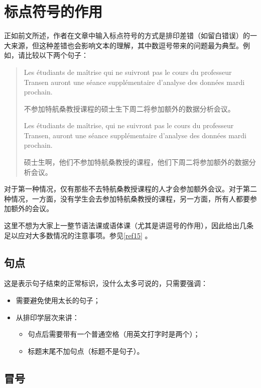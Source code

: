 \section{标点符号的作用}

正如前文所述，作者在文章中输入标点符号的方式是排印差错（如留白错误）的一大来源，但这种差错也会影响文本的理解，其中数逗号带来的问题最为典型。例如，请比较以下两个句子：

\begin{quote}
    Les étudiants de maîtrise qui ne suivront pas le cours du professeur Transen auront une séance supplémentaire d’analyse des données mardi prochain.
    \begin{bil}
        不参加特航桑教授课程的硕士生下周二将参加额外的数据分析会议。
    \end{bil}

    Les étudiants de maîtrise, qui ne suivront pas le cours du professeur Transen, auront une séance supplémentaire d’analyse des données mardi prochain.
    \begin{bil}
        硕士生啊，他们不参加特航桑教授的课程，他们下周二将参加额外的数据分析会议。
    \end{bil}
\end{quote}

对于第一种情况，仅有那些不去特航桑教授课程的人才会参加额外会议。对于第二种情况，一方面，没有学生会去参加特航桑教授的课程，另一方面，所有人都要参加额外的会议。

这里不想为大家上一整节语法课或语体课（尤其是讲逗号的作用），因此给出几条足以应对大多数情况的注意事项。参见\ref{ref15}%
。

\subsection{句点}

这是表示句子结束的正常标识，没什么太多可说的，只需要强调：

\begin{itemize}
    \item 需要避免使用太长的句子；
    \item 从排印学层次来讲：
    \begin{itemize}
        \item 句点后需要带有一个普通空格（用英文打字时是两个）；
        \item 标题末尾不加句点（标题不是句子）。
    \end{itemize}
\end{itemize}

\subsection{冒号}


